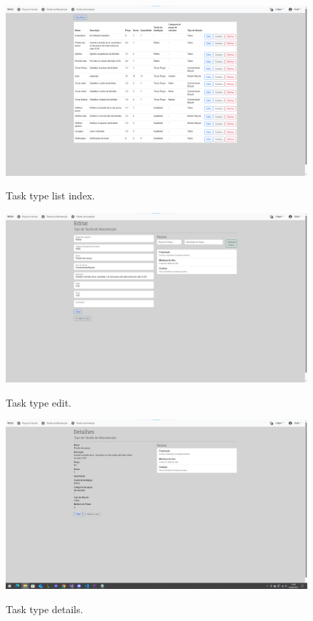 \begin{figure}[h]
  \caption{Task type list index.}
  \centering
  \includegraphics[width=\textwidth]{figs/Implementation/dealershipAdmin/taskIndex}
  \label{fig:figure2}
\end{figure}

\begin{figure}[h]
  \caption{Task type edit.}
  \centering
  \includegraphics[width=\textwidth]{figs/Implementation/dealershipAdmin/taskEdit}
  \label{fig:figure2}
\end{figure}


\begin{figure}[h]
  \caption{Task type details.}
  \centering
  \includegraphics[width=\textwidth]{figs/Implementation/dealershipAdmin/taskDetails}
  \label{fig:figure2}
\end{figure}


